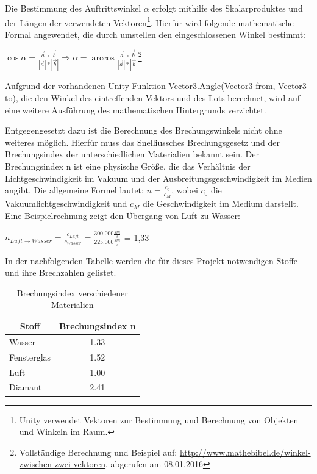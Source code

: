 Die Bestimmung des Auftrittswinkel $\alpha$ erfolgt mithilfe des Skalarproduktes und der Längen der verwendeten Vektoren\footnote{Unity verwendet Vektoren zur Bestimmung und Berechnung von Objekten und Winkeln im Raum.}. Hierfür wird folgende mathematische Formal angewendet, die durch umstellen den eingeschlossenen Winkel bestimmt:
\begin{center}
$\cos\alpha = \frac{\vec{a} ~\circ~ \vec{b}}{|\vec{a}| * |\vec{b}|} \Rightarrow  \alpha = \arccos \frac{\vec{a} ~\circ ~\vec{b}}{|\vec{a}| * |\vec{b}|}$\footnote{Vollständige Berechnung und Beispiel auf: \url{http://www.mathebibel.de/winkel-zwischen-zwei-vektoren}, abgerufen am 08.01.2016}
\end{center}
Aufgrund der vorhandenen Unity-Funktion Vector3.Angle(Vector3 from, Vector3 to), die den Winkel des eintreffenden Vektors und des Lots berechnet, wird auf eine weitere Ausführung des mathematischen Hintergrunds verzichtet. 

Entgegengesetzt dazu ist die Berechnung des Brechungswinkels nicht ohne weiteres möglich. Hierfür muss das Snelliussches Brechungsgesetz und der Brechungsindex der unterschiedlichen Materialien bekannt sein. Der Brechungsindex n ist eine physische Größe, die das Verhältnis der Lichtgeschwindigkeit im Vakuum und der Ausbreitungsgeschwindigkeit im Medien angibt. Die allgemeine Formel lautet: $n = \frac{c_0}{c_M}$, wobei $c_0$ die Vakuumlichtgeschwindigkeit und $c_M$ die Geschwindigkeit im Medium darstellt. Eine Beispielrechnung zeigt den Übergang von Luft zu Wasser:
\begin{center}
$n_{Luft\rightarrow Wasser} = \frac{c_{Luft}}{c_{Wasser}} = \frac{300.000\frac{km}{s}}{225.000\frac{km}{s}}$ = 1,33
\end{center}
In der nachfolgenden Tabelle werden die für dieses Projekt notwendigen Stoffe und ihre Brechzahlen gelistet.

\begin{table}[H]
\centering
\begin{tabular}{l|c}
\multicolumn{1}{c}{Stoff} & \multicolumn{1}{|c}{Brechungsindex n} \\ \hline \hline
Wasser                    & 1.33                               \\ \hline
Fensterglas               & 1.52                               \\ \hline
Luft                      & 1.00                               \\ \hline
Diamant                   & 2.41                               
\end{tabular}
\caption[Brechungsindex verschiedener Materialien]{Brechungsindex verschiedener Materialien\cite{brechindize2005}\cite{spektrumakademischerverlag1998}}
\label{brechungsindex}
\end{table} 

